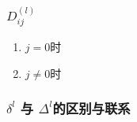 \subsubsection{$D_{ij}^{(l)}$}
\begin{enumerate}
	\item $j=0$时

	\item $j \neq 0$时

\end{enumerate}


\subsubsection{$\delta^{l}$ 与 $\Delta^{l}$的区别与联系}













